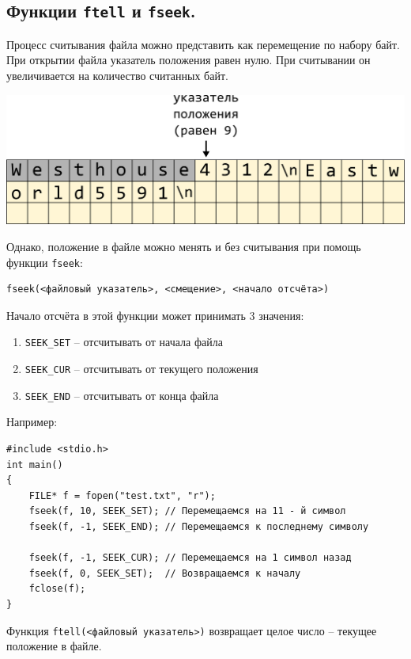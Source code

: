 \documentclass{article}
\begin{document}
\subsection*{Функции \texttt{ftell} и \texttt{fseek}.}
Процесс считывания файла можно представить как перемещение по набору байт. При открытии файла указатель положения равен нулю. При считывании он увеличивается на количество считанных байт.
\begin{center}
\includegraphics[scale=0.8]{../images/positioninfile.png}
\end{center}

Однако, положение в файле можно менять и без считывания при помощь функции \texttt{fseek}:
\begin{verbatim}
fseek(<файловый указатель>, <смещение>, <начало отсчёта>)
\end{verbatim}
Начало отсчёта в этой функции может принимать 3 значения:
\begin{enumerate}
\item \texttt{SEEK\_SET} -- отсчитывать от начала файла
\item \texttt{SEEK\_CUR} -- отсчитывать от текущего положения
\item \texttt{SEEK\_END} -- отсчитывать от конца файла
\end{enumerate}

Например:
\begin{lstlisting}
#include <stdio.h>
int main()
{
    FILE* f = fopen("test.txt", "r");
    fseek(f, 10, SEEK_SET); // Перемещаемся на 11 - й символ
    fseek(f, -1, SEEK_END); // Перемещаемся к последнему символу
	
    fseek(f, -1, SEEK_CUR); // Перемещаемся на 1 символ назад
    fseek(f, 0, SEEK_SET);  // Возвращаемся к началу
    fclose(f);
}

\end{lstlisting}

Функция \texttt{ftell(<файловый указатель>)} возвращает целое число -- текущее положение в файле.
\end{document}
